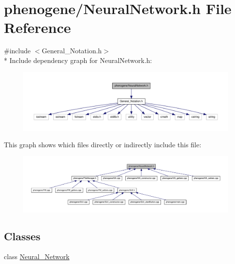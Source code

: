\hypertarget{a00014}{\section{phenogene/\-Neural\-Network.h File Reference}
\label{d2/de7/a00014}
}
{\ttfamily \#include $<$General\-\_\-\-Notation.\-h$>$}\\*
Include dependency graph for Neural\-Network.\-h\-:
\nopagebreak
\begin{figure}[H]
\begin{center}
\leavevmode
\includegraphics[width=350pt]{db/df3/a00034}
\end{center}
\end{figure}
This graph shows which files directly or indirectly include this file\-:
\nopagebreak
\begin{figure}[H]
\begin{center}
\leavevmode
\includegraphics[width=350pt]{d4/d8c/a00035}
\end{center}
\end{figure}
\subsection*{Classes}
\begin{DoxyCompactItemize}
\item 
class \hyperlink{a00003}{Neural\-\_\-\-Network}
\end{DoxyCompactItemize}
